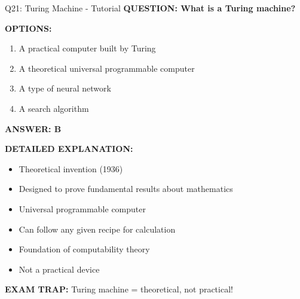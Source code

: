 \documentclass[8pt]{beamer}
\begin{document}
	\begin{frame}{Q21: Turing Machine - Tutorial}
		\fontsize{6.5}{7.5}\selectfont
		\textbf{QUESTION: What is a Turing machine?}
		
		\vspace{0.1cm}
		\textbf{OPTIONS:}
		\begin{enumerate}
			\item A practical computer built by Turing
			\item A theoretical universal programmable computer
			\item A type of neural network
			\item A search algorithm
		\end{enumerate}
		
		\vspace{0.1cm}
		\textcolor{myblue}{\textbf{ANSWER: B}}
		
		\vspace{0.1cm}
		\textbf{DETAILED EXPLANATION:}
		\begin{itemize}
			\item Theoretical invention (1936)
			\item Designed to prove fundamental results about mathematics
			\item Universal programmable computer
			\item Can follow any given recipe for calculation
			\item Foundation of computability theory
			\item Not a practical device
		\end{itemize}
		
		\vspace{0.1cm}
		\textcolor{myred}{\textbf{EXAM TRAP:}} Turing machine = \textcolor{myblue}{theoretical, not practical}!
	\end{frame}
	
\end{document}

